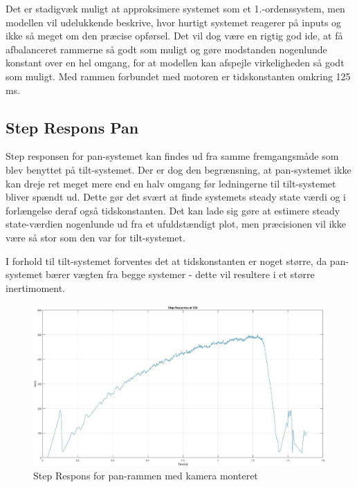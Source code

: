 Det er stadigvæk muligt at approksimere systemet som et 1.-ordenssystem, men modellen vil udelukkende beskrive, hvor hurtigt systemet reagerer på inputs og ikke så meget om den præcise opførsel. Det vil dog være en rigtig god ide, at få afbalanceret rammerne så godt som muligt og gøre modstanden nogenlunde konstant over en hel omgang, for at modellen kan afspejle virkeligheden så godt som muligt. Med rammen forbundet med motoren er tidskonstanten omkring 125 ms.

\subsection{Step Respons Pan}

Step responsen for pan-systemet kan findes ud fra samme fremgangsmåde som blev benyttet på tilt-systemet. Der er dog den begrænsning, at pan-systemet ikke kan dreje ret meget mere end en halv omgang før ledningerne til tilt-systemet bliver spændt ud. Dette gør det svært at finde systemets steady state værdi og i forlængelse deraf også tidskonstanten. Det kan lade sig gøre at estimere steady state-værdien nogenlunde ud fra et ufuldstændigt plot, men præcisionen vil ikke være så stor som den var for tilt-systemet. 

I forhold til tilt-systemet forventes det at tidskonstanten er noget større, da pan-systemet bærer vægten fra begge systemer - dette vil resultere i et større inertimoment. 

\begin{figure}[ht]
	\begin{center}
		\includegraphics[scale=0.35]{Billeder/Pan_Response.jpg}
	\end{center}
	\caption{Step Respons for pan-rammen med kamera monteret}
	\label{fig:Pan_Response}
\end{figure}

